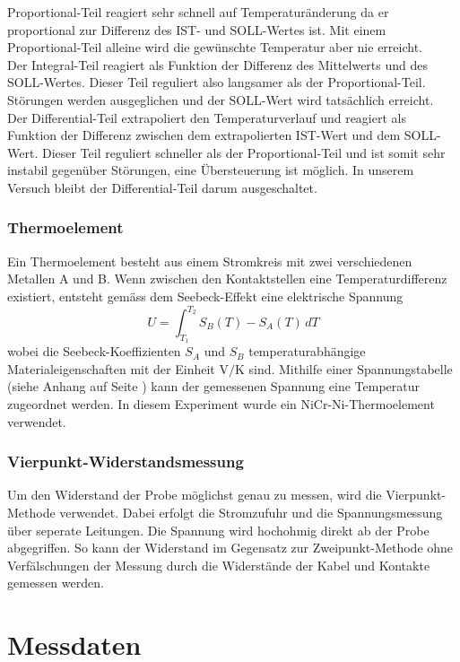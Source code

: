 \documentclass[a4paper,parskip,11pt, DIV12]{scrreprt}
\begin{document}
Proportional-Teil reagiert sehr schnell auf Temperaturänderung da er proportional zur Differenz des IST- und SOLL-Wertes ist. Mit einem Proportional-Teil alleine wird die gewünschte Temperatur aber nie erreicht.\\
Der Integral-Teil reagiert als Funktion der Differenz des Mittelwerts und des SOLL-Wertes. Dieser Teil reguliert also langsamer als der Proportional-Teil. Störungen werden ausgeglichen und der SOLL-Wert wird tatsächlich erreicht.\\
Der Differential-Teil extrapoliert den Temperaturverlauf und reagiert als Funktion der Differenz zwischen dem extrapolierten IST-Wert und dem SOLL-Wert. Dieser Teil reguliert schneller als der Proportional-Teil und ist somit sehr instabil gegenüber Störungen, eine Übersteuerung ist möglich.
In unserem Versuch bleibt der Differential-Teil darum ausgeschaltet. 


\subsection{Thermoelement}
Ein Thermoelement besteht aus einem Stromkreis mit zwei verschiedenen Metallen A und B. Wenn zwischen den Kontaktstellen eine Temperaturdifferenz existiert, entsteht gemäss dem Seebeck-Effekt eine elektrische Spannung 
$$ U = \int_{T_{1}}^{T_{2}} S_{B}(T) - S_{A}(T) \, dT $$
wobei die Seebeck-Koeffizienten $S_{A}$ und $S_{B}$ temperaturabhängige Materialeigenschaften mit der Einheit V$/$K sind. Mithilfe einer Spannungstabelle (siehe Anhang auf Seite \pageref{Kacktabelle}) kann der gemessenen Spannung eine Temperatur zugeordnet werden. In diesem Experiment wurde ein NiCr-Ni-Thermoelement verwendet.

\subsection{Vierpunkt-Widerstandsmessung}
Um den Widerstand der Probe möglichst genau zu messen, wird die Vierpunkt-Methode verwendet. Dabei erfolgt die Stromzufuhr und die Spannungsmessung über seperate Leitungen. Die Spannung wird hochohmig direkt ab der Probe abgegriffen. So kann der Widerstand im Gegensatz zur Zweipunkt-Methode ohne Verfälschungen der Messung durch die Widerstände der Kabel und Kontakte gemessen werden.

\newpage

\chapter{Messdaten}
\end{document}
